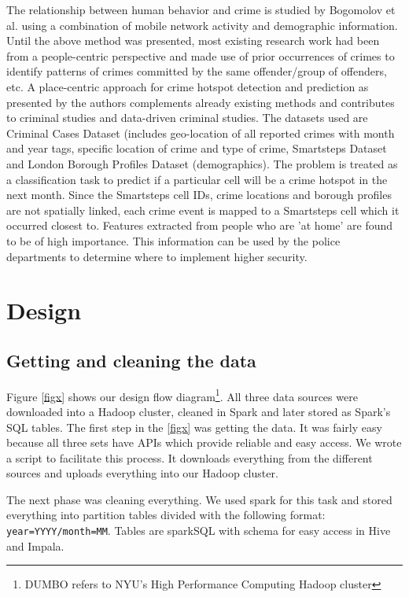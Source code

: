 \documentclass{sigkddExp}
\begin{document}
The relationship between human behavior and crime is studied by Bogomolov et al. \cite{OUAC} using a combination of mobile network activity and demographic information. Until the above method was presented, most existing research work had been from a people-centric perspective and made use of prior occurrences of crimes to identify patterns of crimes committed by the same offender/group of offenders, etc. A place-centric approach for crime hotspot detection and prediction as presented by the authors complements already existing methods and contributes to criminal studies and data-driven criminal studies. 
The datasets used are Criminal Cases Dataset (includes geo-location of all reported crimes with month and year tags, specific location of crime and type of crime, Smartsteps Dataset and London Borough Profiles Dataset (demographics). The problem is treated as a classification task to predict if a particular cell will be a crime hotspot in the next month. Since the Smartsteps cell IDs, crime locations and borough profiles are not spatially linked, each crime event is mapped to a Smartsteps cell which it occurred closest to.  
Features extracted from people who are 'at home' are found to be of high importance. This information can be used by the police departments to determine where to implement higher security.

\section{Design}
\subsection{Getting and cleaning the data}
Figure \ref{figx} shows our design flow diagram\footnote{DUMBO refers to NYU's High Performance Computing Hadoop cluster}. All three data sources were downloaded into a Hadoop cluster, cleaned in Spark and later stored as Spark's SQL tables. 
The first step in the \ref{figx} was getting the data. It was fairly easy because all three sets have APIs which provide reliable and easy access. 
We wrote a script to facilitate this process. It downloads everything from the different sources and uploads everything into our Hadoop cluster. 

The next phase was cleaning everything. We used spark for this task and stored everything into partition tables divided with the following format: \texttt{year=YYYY/month=MM}. Tables are  sparkSQL with schema for easy access in Hive and Impala.
\end{document}

